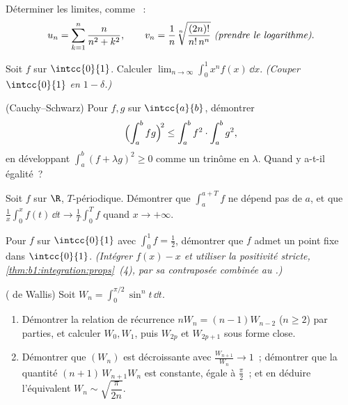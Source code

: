 \begin{exercise}[$\star$]\label{exo:b1:integration:3}
Déterminer les limites, comme ~:
\[
u_n = \sum_{k=1}^{n} \frac{n}{n^2 + k^2},
\qquad
v_n = \frac{1}{n}\sqrt[n]{\frac{(2n)!}{n!\,n^n}}
\ \emph{(prendre le logarithme)}.
\]
\end{exercise}

\begin{exercise}[$\star$]\label{exo:b1:integration:4}
Soit $f$  sur $\intcc{0}{1}$. Calculer $\lim_{n\to\infty}
\int_0^1 x^n f(x)\,\dd x$. \emph{(Couper $\intcc{0}{1}$ en $1 -
\delta$.)}
\end{exercise}

\begin{exercise}[$\star\star$]\label{exo:b1:integration:5}
(Cauchy--Schwarz) Pour $f, g$  sur $\intcc{a}{b}$, démontrer
\[
\Bigl(\int_a^b fg\Bigr)^{\!2} \leq \int_a^b f^2 \cdot \int_a^b g^2 ,
\]
en développant $\int_a^b (f + \lambda g)^2 \geq 0$ comme un trinôme en
$\lambda$. Quand y a-t-il égalité~?
\end{exercise}

\begin{exercise}[$\star\star$]\label{exo:b1:integration:6}
Soit $f$  sur $\R$, $T$-périodique. Démontrer que
$\int_a^{a+T} f$ ne dépend pas de $a$, et que $\frac1x \int_0^x
f(t)\,\dd t \to \frac 1T \int_0^T f$ quand $x \to +\infty$.
\end{exercise}

\begin{exercise}[$\star\star$]\label{exo:b1:integration:7}
Pour $f$  sur $\intcc{0}{1}$ avec $\int_0^1 f = \frac12$,
démontrer que $f$ admet un point fixe dans $\intcc{0}{1}$.
\emph{(Intégrer $f(x) - x$ et utiliser la positivité stricte,
\cref{thm:b1:integration:props}~(4), par sa contraposée combinée au
.)}
\end{exercise}

\begin{exercise}[$\star\star\star$]\label{exo:b1:integration:8}
( de Wallis) Soit $W_n = \int_0^{\pi/2} \sin^n t\,\dd t$.
\begin{enumerate}
  \item Démontrer la relation de récurrence $n W_n = (n-1) W_{n-2}$
        ($n \geq 2$) par parties, et calculer $W_0, W_1$, puis
        $W_{2p}$ et $W_{2p+1}$ sous forme close.
  \item Démontrer que $(W_n)$ est décroissante avec
        $\frac{W_{n+1}}{W_n} \to 1$~; démontrer que la quantité
        $(n+1)\,W_{n+1} W_n$ est constante, égale à $\frac\pi2$~; et
        en déduire l'équivalent $W_n \sim \sqrt{\dfrac{\pi}{2n}}$.
\end{enumerate}
\end{exercise}

